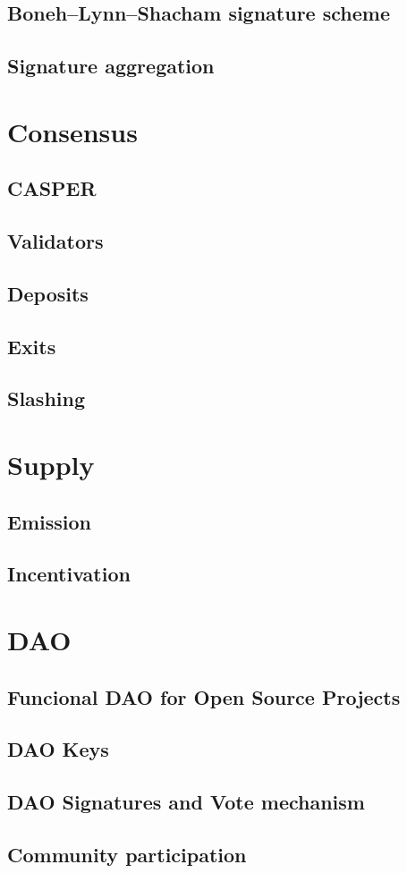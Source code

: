\documentclass{article}
\begin{document}
		\subsection{Boneh–Lynn–Shacham signature scheme}
	    \subsection{Signature aggregation}	
	    
	\section{Consensus}
	    \subsection{CASPER}	
	    \subsection{Validators}		    
	    \subsection{Deposits}	
	    \subsection{Exits}		    
	    \subsection{Slashing}	

	\section{Supply}
	    \subsection{Emission}	
	    \subsection{Incentivation}		    
	    
	\section{DAO}
	    \subsection{Funcional DAO for Open Source Projects}	
	    \subsection{DAO Keys}		    
	    \subsection{DAO Signatures and Vote mechanism}		    
	    \subsection{Community participation}		    

	
\end{document}
